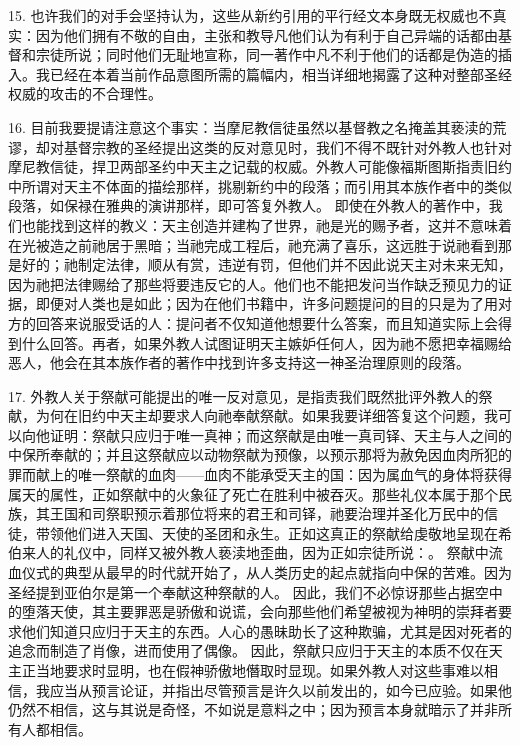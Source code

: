 15. 也许我们的对手会坚持认为，这些从新约引用的平行经文本身既无权威也不真实：因为他们拥有不敬的自由，主张和教导凡他们认为有利于自己异端的话都由基督和宗徒所说；同时他们无耻地宣称，同一著作中凡不利于他们的话都是伪造的插入。我已经在本着当前作品意图所需的篇幅内，相当详细地揭露了这种对整部圣经权威的攻击的不合理性。\par

16. 目前我要提请注意这个事实：当摩尼教信徒虽然以基督教之名掩盖其亵渎的荒谬，却对基督宗教的圣经提出这类的反对意见时，我们不得不既针对外教人也针对摩尼教信徒，捍卫两部圣约中天主之记载的权威。外教人可能像福斯图斯指责旧约中所谓对天主不体面的描绘那样，挑剔新约中的段落；而引用其本族作者中的类似段落，如保禄在雅典的演讲那样，即可答复外教人。 即使在外教人的著作中，我们也能找到这样的教义：天主创造并建构了世界，祂是光的赐予者，这并不意味着在光被造之前祂居于黑暗；当祂完成工程后，祂充满了喜乐，这远胜于说祂看到那是好的；祂制定法律，顺从有赏，违逆有罚，但他们并不因此说天主对未来无知，因为祂把法律赐给了那些将要违反它的人。他们也不能把发问当作缺乏预见力的证据，即便对人类也是如此；因为在他们书籍中，许多问题提问的目的只是为了用对方的回答来说服受话的人：提问者不仅知道他想要什么答案，而且知道实际上会得到什么回答。再者，如果外教人试图证明天主嫉妒任何人，因为祂不愿把幸福赐给恶人，他会在其本族作者的著作中找到许多支持这一神圣治理原则的段落。\par

17. 外教人关于祭献可能提出的唯一反对意见，是指责我们既然批评外教人的祭献，为何在旧约中天主却要求人向祂奉献祭献。如果我要详细答复这个问题，我可以向他证明：祭献只应归于唯一真神；而这祭献是由唯一真司铎、天主与人之间的中保所奉献的；并且这祭献应以动物祭献为预像，以预示那将为赦免因血肉所犯的罪而献上的唯一祭献的血肉——血肉不能承受天主的国：因为属血气的身体将获得属天的属性，正如祭献中的火象征了死亡在胜利中被吞灭。那些礼仪本属于那个民族，其王国和司祭职预示着那位将来的君王和司铎，祂要治理并圣化万民中的信徒，带领他们进入天国、天使的圣团和永生。正如这真正的祭献给虔敬地呈现在希伯来人的礼仪中，同样又被外教人亵渎地歪曲，因为正如宗徒所说：。 祭献中流血仪式的典型从最早的时代就开始了，从人类历史的起点就指向中保的苦难。因为圣经提到亚伯尔是第一个奉献这种祭献的人。 因此，我们不必惊讶那些占据空中的堕落天使，其主要罪恶是骄傲和说谎，会向那些他们希望被视为神明的崇拜者要求他们知道只应归于天主的东西。人心的愚昧助长了这种欺骗，尤其是因对死者的追念而制造了肖像，进而使用了偶像。 因此，祭献只应归于天主的本质不仅在天主正当地要求时显明，也在假神骄傲地僭取时显现。如果外教人对这些事难以相信，我应当从预言论证，并指出尽管预言是许久以前发出的，如今已应验。如果他仍然不相信，这与其说是奇怪，不如说是意料之中；因为预言本身就暗示了并非所有人都相信。\par

